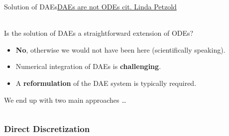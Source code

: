 \begin{frame}{Solution of \aclp{DAE}}{\underline{\acp{DAE} are not \acp{ODE} cit. Linda Petzold}}
  \vspace{-1.5cm}\hspace{4.25cm} \\[1.0em]

  Is the solution of \acp{DAE} a straightforward extension of \acp{ODE}?
  \begin{itemize}
    \item \textbf{No}, otherwise we would not have been here (scientifically speaking).
    \item Numerical integration of \acp{DAE} is \textbf{challenging}.
    \item A \textbf{reformulation} of the \ac{DAE} system is typically required.
  \end{itemize}
  \vspace{1.0em}
  We end up with two main approaches \dots
  \vspace{1.5em}
  \begin{columns}
    \begin{column}[t]{0.5\textwidth}
      \centering
    \end{column}
    \begin{column}[t]{0.5\textwidth}
      \centering
    \end{column}
  \end{columns}
  \vspace{1.5em}
\end{frame}

\subsubsection{Direct Discretization}

